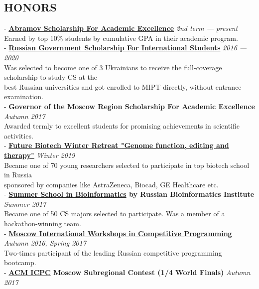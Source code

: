 \documentclass[11pt]{res}
\newcommand{\vmarginsmall}{\vspace{0.1cm}}
\begin{document}
\begin{resume}
\section{HONORS}
\vmarginsmall
- \textbf{\href{http://phystech-foundation.org/en/foundation_}{Abramov Scholarship For Academic Excellence}} \hfill{} \textit{2nd term — present}\\
\hphantom{-} Earned by top 10\% students by cumulative GPA in their academic program.\vspace{0.2em}\\
- \textbf{\href{https://studyinrussia.ru/en/study-in-russia/scholarships}{Russian Government Scholarship For International Students}} \hfill{} \textit{2016 — 2020}\\
\hphantom{-} Was selected to become one of 3 Ukrainians to receive the full-coverage scholarship to study CS at the \\\hphantom{-} best Russian universities and got enrolled to MIPT directly, without entrance examination.\vmarginsmall\\
- \textbf{Governor of the Moscow Region Scholarship For Academic Excellence} \hfill \textit{Autumn 2017}\\
\hphantom{-} Awarded termly to excellent students for promising achievements in scientific activities.\vmarginsmall\\
- \textbf{\href{http://winter2019.futurebiotech.ru/}{Future Biotech Winter Retreat "Genome function, editing and therapy"}} \hfill{} \textit{Winter 2019}\\
\hphantom{-}  Became one of 70 young researchers selected to participate in top biotech school in Russia\\ 
\hphantom{-}  sponsored by companies like AstraZeneca, Biocad, GE Healthcare etc. \vmarginsmall\\
- \textbf{\href{https://bioinf.me/en/education}{Summer School in Bioinformatics} by Russian Bioinformatics Institute} \hfill{} \textit{Summer 2017}\\
\hphantom{-} Became one of 50 CS majors selected to participate. Was a member of a hackathon-winning team.\vmarginsmall\\
- \textbf{\href{https://it-edu.mipt.ru/pages/workshops/?lang=en}{Moscow International Workshops in Competitive Programming}} \hfill{} \textit{Autumn 2016, Spring 2017}\\
\hphantom{-}  	Two-times participant of the leading Russian competitive programming bootcamp.\vmarginsmall\\
- \textbf{\href{https://icpc.baylor.edu/}{ACM ICPC} Moscow Subregional Contest (1/4 World Finals)} \hfill{} \textit{Autumn 2017}\\

\end{resume}
\end{document}
